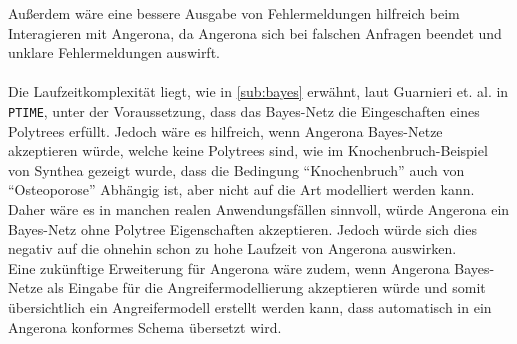 \documentclass[german,version-2020-11]{uzl-thesis}
\begin{document}
Außerdem wäre eine bessere Ausgabe von Fehlermeldungen hilfreich beim Interagieren mit Angerona, da Angerona sich bei falschen Anfragen beendet und unklare Fehlermeldungen auswirft. \\ \\ 
Die Laufzeitkomplexität liegt, wie in \cref{sub:bayes} erwähnt, laut Guarnieri et. al. \cite{guarnieri2017securing} in \texttt{PTIME}, unter der Voraussetzung, dass das Bayes-Netz die Eingeschaften eines Polytrees erfüllt. Jedoch wäre es hilfreich, wenn Angerona Bayes-Netze akzeptieren würde, welche keine Polytrees sind, wie im Knochenbruch-Beispiel von Synthea gezeigt wurde, dass die Bedingung \enquote{Knochenbruch} auch von \enquote{Osteoporose} Abhängig ist, aber nicht auf die Art modelliert werden kann. Daher wäre es in manchen realen Anwendungsfällen sinnvoll, würde Angerona ein Bayes-Netz ohne Polytree Eigenschaften akzeptieren. Jedoch würde sich dies negativ auf die ohnehin schon zu hohe Laufzeit von Angerona auswirken.\\ 
Eine zukünftige Erweiterung für Angerona wäre zudem, wenn Angerona Bayes-Netze als Eingabe für die Angreifermodellierung akzeptieren würde und somit übersichtlich ein Angreifermodell erstellt werden kann, dass automatisch in ein Angerona konformes Schema übersetzt wird.





%
\end{document}

